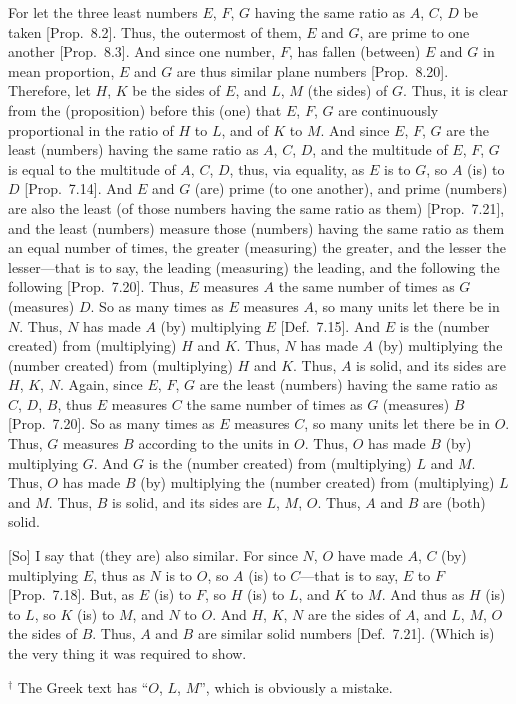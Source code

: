 \begin{Parallel}{}{}
{For let the three least numbers $E$, $F$, $G$  having the
same ratio as $A$, $C$, $D$ be taken [Prop.~8.2]. Thus,
the outermost of them, $E$ and $G$, are prime to one another
[Prop.~8.3]. And since one number, $F$, has
fallen (between) $E$ and $G$ in mean proportion, $E$ and $G$ are thus
similar plane numbers [Prop.~8.20].
Therefore, let $H$, $K$ be the sides of $E$, and $L$, $M$ (the sides) of $G$. Thus, it is clear from the (proposition) before this (one)
that $E$, $F$, $G$ are continuously proportional in the ratio of $H$ to $L$,
and of $K$ to $M$. And since $E$, $F$, $G$ are the least (numbers)
having the same ratio as $A$, $C$, $D$, and the multitude of $E$, $F$, $G$
is equal to the multitude of $A$, $C$, $D$, thus, via equality, as $E$ is to
$G$, so $A$ (is) to $D$ [Prop.~7.14]. And
$E$ and $G$ (are) prime (to one another), and prime (numbers) are also the least (of
those numbers having the same ratio as them) [Prop.~7.21],
and the least (numbers) measure those (numbers) having the same ratio
as them an equal number of times, the greater (measuring) the greater, and
the lesser the lesser---that is to say, the leading (measuring) the leading, and
the following the following [Prop.~7.20]. Thus,
$E$ measures $A$ the same number of times as $G$ (measures) $D$. 
So as many times as $E$ measures $A$, so many units let there be in $N$.
Thus, $N$ has made $A$ (by) multiplying $E$ [Def.~7.15]. And $E$ is the (number created) from (multiplying) $H$ and $K$. Thus, $N$ has made $A$ (by) multiplying
the (number created) from (multiplying) $H$ and $K$. Thus, $A$ is  solid, and its sides are $H$, $K$, $N$. Again, since $E$, $F$, $G$
are the least (numbers) having the same ratio as $C$, $D$, $B$, thus $E$
measures $C$ the same number of times as $G$ (measures) $B$ [Prop.~7.20]. So as many times as $E$ measures $C$, so many units let there be in $O$. Thus, $G$ measures $B$ according to
the units in $O$. Thus, $O$ has made $B$ (by) multiplying $G$. And
$G$ is the (number created) from (multiplying) $L$ and $M$. Thus, $O$ has made $B$ (by) multiplying the (number created) from (multiplying)
$L$ and $M$. Thus, $B$ is  solid, and its sides are $L$, $M$, $O$.
Thus,  $A$ and $B$ are (both) solid.

\epsfysize=2in
\centerline{}

\mbox{[}So] I say that (they are) also similar. For since $N$, $O$ have made
$A$, $C$ (by) multiplying $E$, thus as $N$ is to $O$, so $A$ (is) to $C$---that is to say, $E$ to $F$ [Prop.~7.18]. But, as $E$
(is) to $F$, so $H$ (is) to $L$, and $K$ to $M$. And thus as $H$ (is) to $L$,
so $K$ (is) to $M$, and $N$ to $O$. And $H$, $K$, $N$
are the sides of $A$, and $L$, $M$, $O$ the sides of $B$. Thus,
$A$ and $B$ are similar solid numbers [Def.~7.21]. 
(Which is) the very thing it was required to show.}
\end{Parallel}
{\footnotesize\noindent$^\dag$ The Greek text has ``$O$, $L$, $M$'', which is obviously a mistake.}

